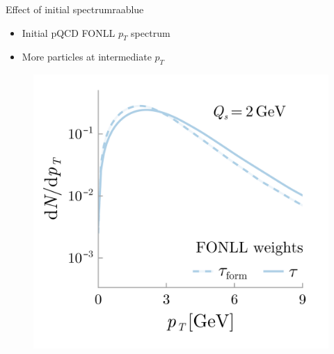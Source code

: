 \documentclass[aspectratio=169,11pt,usenames,dvipsnames]{beamer}
\begin{document}
\begin{frame}
\begin{columns}[onlytextwidth,t]
       \begin{center}
        \begin{custombox}{{\normalsize Effect of initial spectrum}}{raablue}
            \small
            \begin{varwidth}{0.85\textwidth}
            \begin{itemize}
                \itemsep0em
                \footnotesize
                \item Initial pQCD FONLL $p_T$ spectrum
                \item More particles at intermediate $p_T$
            \end{itemize}
            \end{varwidth}
        \end{custombox}

        \vspace{-15pt}
        \begin{figure}
            \centering
            \includegraphics[height=0.7\textheight]{images/final_sketch_raa_gl_fonll_v4_fonll.png}
        \end{figure}

       \end{center}
    \end{columns}
\end{frame}
\end{document}
